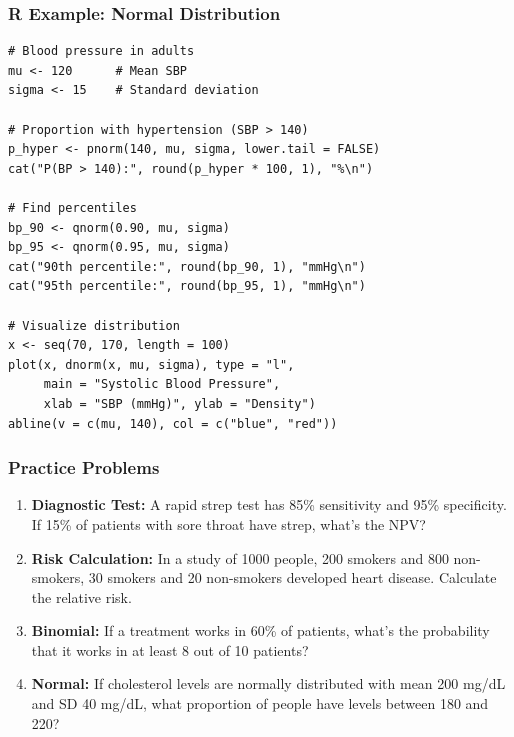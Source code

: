 \documentclass{beamer}
\begin{document}
\begin{frame}[fragile]
\frametitle{R Example: Normal Distribution}
\footnotesize
\begin{verbatim}
# Blood pressure in adults
mu <- 120      # Mean SBP
sigma <- 15    # Standard deviation

# Proportion with hypertension (SBP > 140)
p_hyper <- pnorm(140, mu, sigma, lower.tail = FALSE)
cat("P(BP > 140):", round(p_hyper * 100, 1), "%\n")

# Find percentiles
bp_90 <- qnorm(0.90, mu, sigma)
bp_95 <- qnorm(0.95, mu, sigma)
cat("90th percentile:", round(bp_90, 1), "mmHg\n")
cat("95th percentile:", round(bp_95, 1), "mmHg\n")

# Visualize distribution
x <- seq(70, 170, length = 100)
plot(x, dnorm(x, mu, sigma), type = "l",
     main = "Systolic Blood Pressure",
     xlab = "SBP (mmHg)", ylab = "Density")
abline(v = c(mu, 140), col = c("blue", "red"))
\end{verbatim}
\end{frame}

\begin{frame}
\frametitle{Practice Problems}
\begin{enumerate}
\item \textbf{Diagnostic Test:} A rapid strep test has 85\% sensitivity and 95\% specificity. If 15\% of patients with sore throat have strep, what's the NPV?

\item \textbf{Risk Calculation:} In a study of 1000 people, 200 smokers and 800 non-smokers, 30 smokers and 20 non-smokers developed heart disease. Calculate the relative risk.

\item \textbf{Binomial:} If a treatment works in 60\% of patients, what's the probability that it works in at least 8 out of 10 patients?

\item \textbf{Normal:} If cholesterol levels are normally distributed with mean 200 mg/dL and SD 40 mg/dL, what proportion of people have levels between 180 and 220?
\end{enumerate}
\end{frame}
\end{document}
